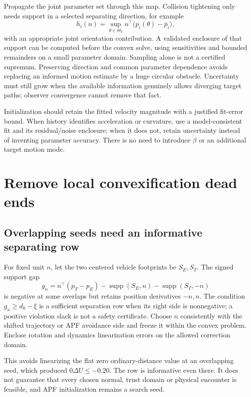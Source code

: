 \documentclass[11pt]{article}
\newcommand{\support}{\operatorname{supp}}
\begin{document}
Propagate the joint parameter set through this map. Collision tightening
only needs support in a selected separating direction, for example
\[
 h_i(n)=\sup_{\theta\in\Theta_k}
 n^\top\big(p_i(\theta)-\bar p_i\big),
\]
with an appropriate joint orientation contribution. A validated enclosure
of that support can be computed before the convex solve, using sensitivities
and bounded remainders on a small parameter domain. Sampling alone is not a
certified supremum. Preserving direction and common parameter dependence
avoids replacing an informed motion estimate by a huge circular obstacle.
Uncertainty must still grow when the available information genuinely allows
diverging target paths; observer convergence cannot remove that fact.

Initialization should retain the fitted velocity magnitude with a justified
fit-error bound. When history identifies acceleration or curvature, use a
model-consistent fit and its residual/noise enclosure; when it does not,
retain uncertainty instead of inventing parameter accuracy. There is no
need to introduce $\dot\beta$ or an additional target motion mode.

\section{Remove local convexification dead ends}
\subsection{Overlapping seeds need an informative separating row}
For fixed unit $n$, let the two centered vehicle footprints be $S_E,S_T$.
The signed support gap
\begin{equation}\label{eq:gap}
 g_n=n^\top(p_T-p_E)-\support(S_E,n)-\support(S_T,-n)
\end{equation}
is negative at some overlaps but retains position derivatives $-n,n$.
The condition $g_n\ge d_0-\xi$ is a sufficient separation row when its
right side is nonnegative; a positive violation slack is not a safety
certificate. Choose $n$ consistently with the shifted trajectory or APF
avoidance side and freeze it within the convex problem. Enclose rotation
and dynamics linearization errors on the allowed correction domain.

This avoids linearizing the flat zero ordinary-distance value at an
overlapping seed, which produced $0\Delta U\le-0.20$. The row is informative
even there. It does not guarantee that every chosen normal, trust domain or
physical encounter is feasible, and APF initialization remains a search seed.
\end{document}
